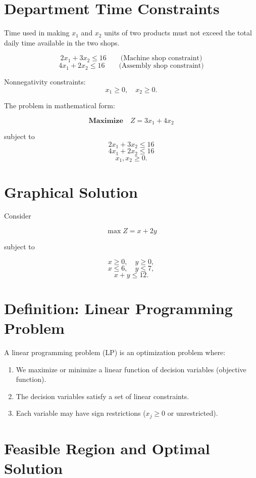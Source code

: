 \documentclass[12pt]{article}
\begin{document}
\section{Department Time Constraints}

Time used in making $x_1$ and $x_2$ units of two products must not exceed the total daily time available in the two shops.

\[
2x_1 + 3x_2 \le 16 \qquad \text{(Machine shop constraint)}
\]
\[
4x_1 + 2x_2 \le 16 \qquad \text{(Assembly shop constraint)}
\]

Nonnegativity constraints:
\[
x_1 \ge 0, \quad x_2 \ge 0.
\]

The problem in mathematical form:

\[
\textbf{Maximize} \quad Z = 3x_1 + 4x_2
\]

subject to
\[
2x_1 + 3x_2 \le 16
\]
\[
4x_1 + 2x_2 \le 16
\]
\[
x_1, x_2 \ge 0.
\]

\section{Graphical Solution}

Consider

\[
\max Z = x + 2y
\]

subject to

\[
x \ge 0, \quad y \ge 0,
\]
\[
x \le 6, \quad y \le 7,
\]
\[
x + y \le 12.
\]

\section{Definition: Linear Programming Problem}

A linear programming problem (LP) is an optimization problem where:

\begin{enumerate}
\item We maximize or minimize a linear function of decision variables (objective function).
\item The decision variables satisfy a set of linear constraints.
\item Each variable may have sign restrictions ($x_j \ge 0$ or unrestricted).
\end{enumerate}

\section{Feasible Region and Optimal Solution}
\end{document}
